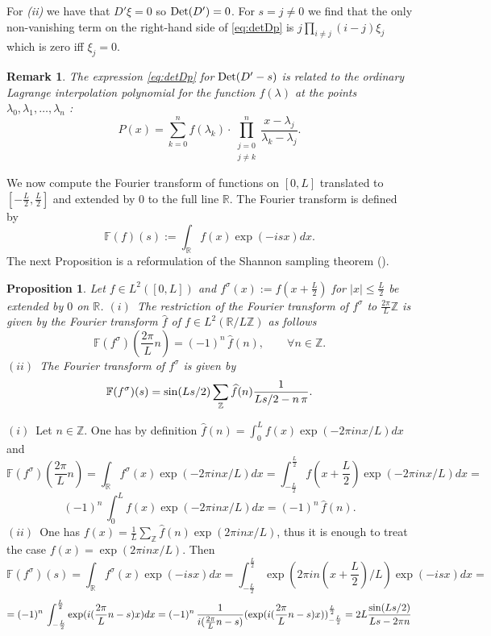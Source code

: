 \documentclass{amsart}
\newtheorem{prop}[thm]{Proposition}
\newtheorem{rem}[thm]{Remark}
\def\Det{{\rm Det}}
\def\F{{\mathbb F}}
\def\R{{\mathbb R}}
\def\Z{{\mathbb Z}}
\def\sin{{{\rm sin}}}
\def\fourier{\F}
\def\fourier{\F}
\def\F{{\mathbb F}}
\def\F{{\mathbb F}}
\def\R{{\mathbb R}}
\def\Z{{\mathbb Z}}
\def\fourier{\F}
\def\sin{{{\rm sin}}}
\def\Det{{\rm Det}}
\begin{document}
 For {\em (ii)} we have that $D ' \xi = 0$ so $\Det (D' ) = 0$.
 For $s= j \neq 0$ we find that the only non-vanishing term on the right-hand side of \eqref{eq:detDp} is $j \prod_{i\neq j} (i -j ) \xi_j$ which is zero iff $\xi_j=0$.
 \endproof 
 \begin{rem} The expression \eqref{eq:detDp} for ${\rm Det}(D'-s)$ is related to 
 the ordinary Lagrange interpolation polynomial for the function $f(\lambda)$ at the points $\lambda_0, \lambda_1, \ldots, \lambda_n$   :
$$
P(x) = \sum_{k=0}^{n} f(\lambda_k) \cdot \prod_{\substack{j=0 \\ j \ne k}}^{n} \frac{x - \lambda_j}{\lambda_k - \lambda_j}.
$$
 \end{rem}

We now compute the Fourier transform of functions on $[0,L]$ translated to $[-\frac L2,\frac L2]$ and extended by $0$ to the full line $\R$. The Fourier transform is defined by
$$
\fourier(f)(s):=\int_\R f(x)\exp(- isx)dx.
$$
The next Proposition is a reformulation of the Shannon sampling theorem (\cite{Shannon}).
\begin{prop}Let $f\in L^2([0,L])$ and $f^\sigma(x):=f(x+\frac L2)$ for $\vert x\vert\leq \frac L2$ be extended by $0$ on $\R$.\newline
$(i)$~The restriction of the Fourier transform of $f^\sigma$ to $\frac{2\pi}{L}\Z$ is given by the Fourier transform $\widehat{ f}$ of $f\in L^2(\R/L\Z)$ as follows
\begin{equation}\label{fourz}
\fourier(f^\sigma)(\frac{2\pi}{L}n)=(-1)^n\, \widehat{ f}(n), \qquad \forall n\in \Z.
\end{equation} 
$(ii)$~The Fourier transform of $f^\sigma$ is given by 
\begin{equation}\label{four}
\fourier(f^\sigma)(s)=\sin(L s/2)\sum_\Z  \widehat{ f}(n)\frac{1}{Ls/2-n\,\pi }.
\end{equation}	
\end{prop}
\proof $(i)$~Let $n\in \Z$. One has by definition $\widehat{ f}(n)=\int_{0}^{L}f(x)\exp(-2\pi inx/L)dx$ and
$$
\fourier(f^\sigma)(\frac{2\pi}{L}n)=\int_\R f^\sigma(x)\exp(-2\pi inx/L)dx=\int_{-\frac L2}^{\frac L2}f(x+\frac L2)\exp(-2\pi inx/L)dx=$$ $$(-1)^n\,\int_{0}^{L}f(x)\exp(-2\pi inx/L)dx=(-1)^n\,\widehat{ f}(n).
$$
$(ii)$~One has $f(x)=\frac 1L\sum_\Z \widehat{ f}(n)\exp(2\pi inx/L)$, thus it is enough to treat the case $f(x)=\exp(2\pi inx/L)$. Then 
$$
\fourier(f^\sigma)(s)=\int_\R f^\sigma(x)\exp(- isx)dx=\int_{-\frac L2}^{\frac L2}\exp(2\pi in(x+\frac L2)/L)\exp(- isx)dx=$$ $$=(-1)^n\,\int_{-\frac L2}^{\frac L2}\exp(i(\frac{2\pi}{L}n-s)x)dx=(-1)^n\,\frac{1}{i(\frac{2\pi}{L}n-s)}(\exp(i(\frac{2\pi}{L}n-s)x))_{-\frac L2}^{\frac L2}=2L\frac{\sin(Ls/2)}{Ls-2\pi n}
$$
\end{document}
